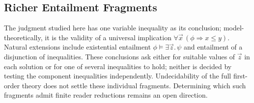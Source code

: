 \subsection{Richer Entailment Fragments}
\label{sec:conclusion}

The judgment studied here has one variable inequality as its conclusion;
model-theoretically, it is the validity of a universal implication
$\forall\vec x\,(\phi\Rightarrow x\le y)$. Natural extensions include
existential entailment $\phi\models\exists\vec z.\,\psi$ and entailment of a
disjunction of inequalities. These conclusions ask either for suitable
values of $\vec z$ in each solution or for one of several inequalities to
hold; neither is decided by testing the component inequalities
independently. Undecidability of the full first-order theory
\citep{SuAikenNiehrenPriesnitzTreinen02} does not settle these individual
fragments. Determining which such fragments admit finite reader reductions
remains an open direction.
